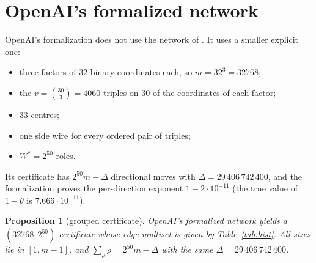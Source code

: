 \documentclass[11pt]{article}
\newtheorem{proposition}[theorem]{Proposition}
\theoremstyle{definition}
\theoremstyle{remark}
\begin{document}
\section{OpenAI's formalized network}\label{sec:oainet}

OpenAI's formalization \cite{oailean} does not use the network of \cite[Section~2]{oai}. It uses a
smaller explicit one:
\begin{itemize}
\item three factors of $32$ binary coordinates each, so $m=32^3=32768$;
\item the $v=\binom{30}3=4060$ triples on $30$ of the coordinates of each factor;
\item $33$ centres;
\item one side wire for every ordered pair of triples;
\item $W^*=2^{50}$ roles.
\end{itemize}
Its certificate has $2^{50}m-\Delta$ directional moves with $\Delta=29\,406\,742\,400$,
and the formalization proves the per-direction exponent $1-2\cdot10^{-11}$ (the true value of
$1-\theta$ is $7.666\cdot10^{-11}$).

\begin{proposition}[grouped certificate]\label{prop:oaicert}
OpenAI's formalized network yields a $(32768,2^{50})$-certificate whose edge multiset is given by
Table~\ref{tab:hist}. All sizes lie in $[1,m-1]$, and $\sum_\rho\rho=2^{50}m-\Delta$ with the same
$\Delta=29\,406\,742\,400$.
\end{proposition}
\end{document}
